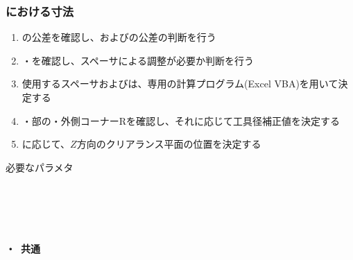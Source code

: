 \subsubsection{\EndFacecutMilling における寸法}
\begin{enumerate}[label=\sarrow]
\item {}\nameWorkTotalLength の公差を確認し、\TopAlocationLength および\BottomAlocationLength の公差の判断を行う
\item \TopAlocationLength・\BottomAlocationLength を確認し、スペーサによる調整が必要か判断を行う
\item 使用するスペーサおよび\ReAlocationLength は、専用の計算プログラム(Excel VBA)を用いて決定する
\item \OuterDiameter・\nameEndFace 部の\nameThickness・\nameEndFace 外側コーナーRを確認し、それに応じて工具径補正値を決定する
\item \ReAlocationLength に応じて、$Z$方向のクリアランス平面の位置を決定する
\end{enumerate}
\begin{Parameter}{必要なパラメタ}
\paragraph*{\ReAlocationLength}
\PMWorkTotalLength
\PMTopAlocationLength
\PMBottomAlocationLength
\PMACOD
\PMJigLength
{}
\tcbline*
\paragraph*{\TopEndFacecut}
\PMTopReAlocationLength
\PMACOD
\PMBDOD
\PMODCornerR\\
\PMTopEndACID
\PMTopEndBDID
{}
\tcbline*
\paragraph*{\BottomEndFacecut}
\PMBottomReAlocationLength
\PMACOD
\PMBDOD
\PMODCornerR\\
\PMBottomEndACID
\PMBottomEndBDID
{}
\tcbline*
\paragraph*{\TopEndFacecut・\BottomEndFacecut~共通}
\end{Parameter}

